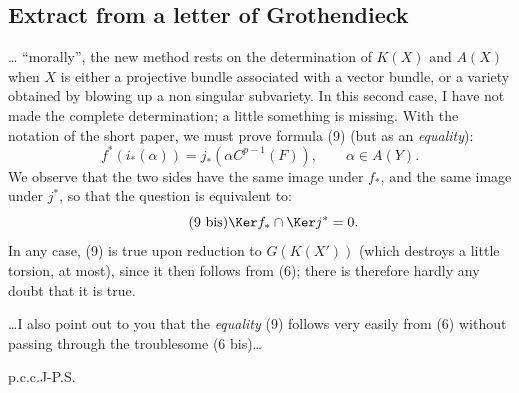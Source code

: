\subsection*{Extract from a letter of Grothendieck}
\dots{} ``morally'', the new method rests on the determination of \(K(X)\) and \(A(X)\) when \(X\) is either a projective bundle associated with a vector bundle, or a variety obtained by blowing up a non%
%
singular subvariety. In this second case, I have not made the complete determination; a little something is missing. With the notation of the short paper, we must prove formula (9) (but as an \emph{equality}):
\begin{equation}\tag{9}
  f^*(i_*(\alpha))=j_*(\alpha C^{p-1}(F)),\qquad \alpha\in A(Y).
\end{equation}
We observe that the two sides have the same image under \(f_*\), and the same image under \(j^*\), so that the question is equivalent to:
\begin{equation}\tag{9 bis}
  \Ker f_*\cap\Ker j^*=0.
\end{equation}
In any case, (9) is true upon reduction to \(G(K(X'))\) (which destroys a little torsion, at most), since it then follows from (6); there is therefore hardly any doubt that it is true.

\dots I also point out to you that the \emph{equality} (9) follows very easily from (6) without passing through the troublesome (6 bis)\dots

\begin{flushleft}
p.c.c.J-P.S.
\end{flushleft}

\newpage

